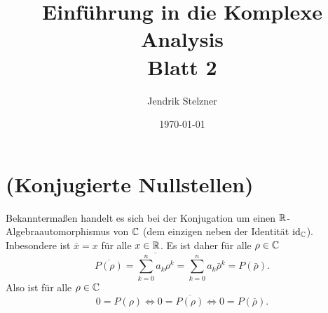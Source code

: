 \documentclass[a4paper,10pt]{article}
\title{\sc Einführung in die Komplexe Analysis \\ \Large Blatt 2}
\author{Jendrik Stelzner}
\date{\today}
\begin{document}
\maketitle





\section{(Konjugierte Nullstellen)}
Bekanntermaßen handelt es sich bei der Konjugation um einen $\mathbb{R}$-Algebraauto\-morph\-ismus von $\mathbb{C}$ (dem einzigen neben der Identität $\operatorname{id}_{\mathbb{C}}$). Inbesondere ist $\bar{x} = x$ für alle $x \in \mathbb{R}$. Es ist daher für alle $\rho \in \mathbb{C}$
\[
 \overline{P(\rho)} = \overline{\sum_{k=0}^n a_k \rho^k} = \sum_{k=0}^n a_k \bar{\rho}^k = P(\bar{\rho}).
\]
Also ist für alle $\rho \in \mathbb{C}$
\[
 0 = P(\rho) \Leftrightarrow 0 = \overline{P(\rho)} \Leftrightarrow 0 = P(\bar{\rho}).
\]
\end{document}
